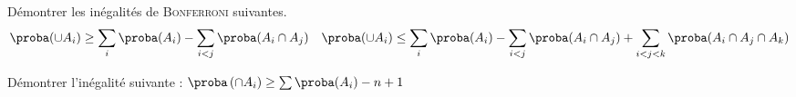 \documentclass{report}
\begin{document}
\begin{exo}
    Démontrer les inégalités de \textsc{Bonferroni} suivantes.
    \[\proba(\cup A_i)\geq \sum_i \proba(A_i)-\sum_{i<j}\proba(A_i\cap A_j)\quad
    \proba(\cup A_i)\leq\sum_i \proba(A_i)-\sum_{i<j}\proba(A_i\cap A_j)+
    \sum_{i<j<k}\proba(A_i\cap A_j\cap A_k)\]
\end{exo}

\begin{exo}
    Démontrer l'inégalité suivante : \(\proba\left(\cap A_i\right)\geq\sum\proba(A_i)-n+1\)
    \boxans{\[\proba (\cap A_i) = 1 - \proba (\overline{\cap A_i}) = 1 - \proba(\cap \bar{A_i})
    \geq 1 - \sum \proba (\bar{A_i}) = 1 - n + \sum \proba(A_i)\]}
\end{exo}
\end{document}
